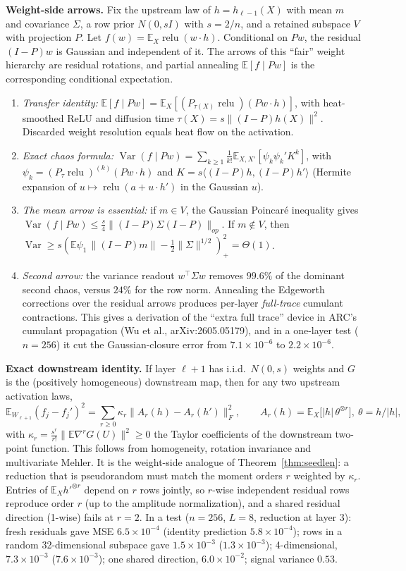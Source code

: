 \documentclass[11pt]{article}
\theoremstyle{definition}
\theoremstyle{remark}
\newcommand{\E}{\mathbb E}
\newcommand{\Var}{\operatorname{Var}}
\newcommand{\relu}{\operatorname{relu}}
\begin{document}
\textbf{Weight-side arrows.} Fix the upstream law of $h=h_{\ell-1}(X)$ with mean $m$ and covariance $\Sigma$, a row prior $N(0,sI)$ with $s=2/n$, and a retained subspace $V$ with projection $P$. Let $f(w)=\E_X\relu(w\cdot h)$. Conditional on $Pw$, the residual $(I-P)w$ is Gaussian and independent of it. The arrows of this ``fair'' weight hierarchy are residual rotations, and partial annealing $\E[f\mid Pw]$ is the corresponding conditional expectation.
\begin{enumerate}
\item \emph{Transfer identity:} $\E[f\mid Pw]=\E_X[(P_{\tau(X)}\relu)(Pw\cdot h)]$, with heat-smoothed ReLU and diffusion time $\tau(X)=s\|(I-P)h(X)\|^2$. Discarded weight resolution equals heat flow on the activation.
\item \emph{Exact chaos formula:} $\Var(f\mid Pw)=\sum_{k\ge1}\frac1{k!}\E_{X,X'}[\psi_k\psi_k'K^k]$, with $\psi_k=(P_\tau\relu)^{(k)}(Pw\cdot h)$ and $K=s\langle(I-P)h,(I-P)h'\rangle$ (Hermite expansion of $u\mapsto\relu(a+u\cdot h')$ in the Gaussian $u$).
\item \emph{The mean arrow is essential:} if $m\in V$, the Gaussian Poincar\'e inequality gives $\Var(f\mid Pw)\le\frac s4\|(I-P)\Sigma(I-P)\|_{op}$. If $m\notin V$, then $\Var\ge s(\E\psi_1\,\|(I-P)m\|-\tfrac12\|\Sigma\|^{1/2})_+^2=\Theta(1)$.
\item \emph{Second arrow:} the variance readout $w^\top\Sigma w$ removes $99.6\%$ of the dominant second chaos, versus $24\%$ for the row norm. Annealing the Edgeworth corrections over the residual arrows produces per-layer \emph{full-trace} cumulant contractions. This gives a derivation of the ``extra full trace'' device in ARC's cumulant propagation (Wu et al., arXiv:2605.05179), and in a one-layer test ($n=256$) it cut the Gaussian-closure error from $7.1\times10^{-6}$ to $2.2\times10^{-6}$.
\end{enumerate}

\textbf{Exact downstream identity.} If layer $\ell+1$ has i.i.d.\ $N(0,s)$ weights and $G$ is the (positively homogeneous) downstream map, then for any two upstream activation laws,
\[\E_{W_{\ell+1}}(f_j-f_j')^2=\sum_{r\ge0}\kappa_r\big\|A_r(h)-A_r(h')\big\|_F^2,\qquad A_r(h)=\E_X\big[|h|\,\theta^{\otimes r}\big],\ \theta=h/|h|,\]
with $\kappa_r=\frac{s^r}{r!}\|\E\nabla^rG(U)\|^2\ge0$ the Taylor coefficients of the downstream two-point function. This follows from homogeneity, rotation invariance and multivariate Mehler. It is the weight-side analogue of Theorem~\ref{thm:seedlen}: a reduction that is pseudorandom must match the moment orders $r$ weighted by $\kappa_r$. Entries of $\E_X h'^{\otimes r}$ depend on $r$ rows jointly, so $r$-wise independent residual rows reproduce order $r$ (up to the amplitude normalization), and a shared residual direction (1-wise) fails at $r=2$. In a test ($n=256$, $L=8$, reduction at layer 3): fresh residuals gave MSE $6.5\times10^{-4}$ (identity prediction $5.8\times10^{-4}$); rows in a random 32-dimensional subspace gave $1.5\times10^{-3}$ ($1.3\times10^{-3}$); 4-dimensional, $7.3\times10^{-3}$ ($7.6\times10^{-3}$); one shared direction, $6.0\times10^{-2}$; signal variance $0.53$.
\end{document}
